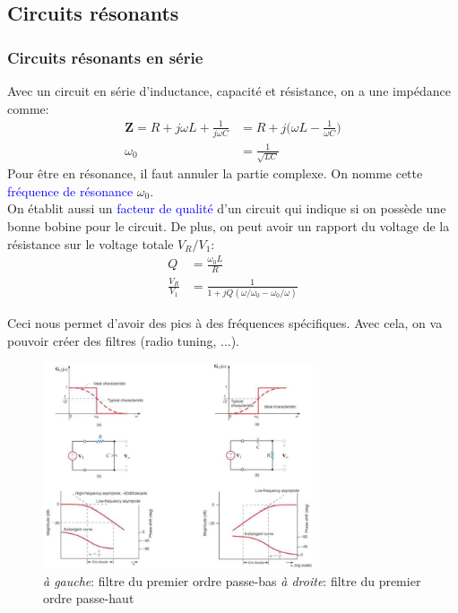 \documentclass{report}
\begin{document}
\subsection{Circuits résonants}

\subsubsection{Circuits résonants en série}
Avec un circuit en série d'inductance, capacité et résistance, on a une impédance comme:
\begin{align*}
\textbf{Z} = R + j\omega L + \frac{1}{j \omega C} &= R + j \Bigr(\omega L - \frac{1}{\omega C} \Bigr)\\
\omega_0 &= \frac{1}{\sqrt{LC}}
\end{align*}
Pour être en résonance, il faut annuler la partie complexe. On nomme cette \textcolor{blue}{fréquence de résonance} $\omega_0$.\\
On établit aussi un \textcolor{blue}{facteur de qualité} d'un circuit qui indique si on possède une bonne bobine pour le circuit. De plus, on peut avoir un rapport du voltage de la résistance sur le voltage totale $V_R / V_1$:
\begin{align*}
Q &= \frac{\omega_0 L}{R}\\
\frac{V_R}{V_1} &= \frac{1}{1 + j Q(\omega/ \omega_0 - \omega_0 / \omega)}
\end{align*}

Ceci nous permet d'avoir des pics à des fréquences spécifiques. Avec cela, on va pouvoir créer des filtres (radio tuning, ...).

\begin{figure}[H]
\centering
\includegraphics[width=8cm]{img/premierOrdre.png}
\caption{\textit{à gauche}: filtre du premier ordre passe-bas \textit{à droite}: filtre du premier ordre passe-haut}
\end{figure}
\end{document}
